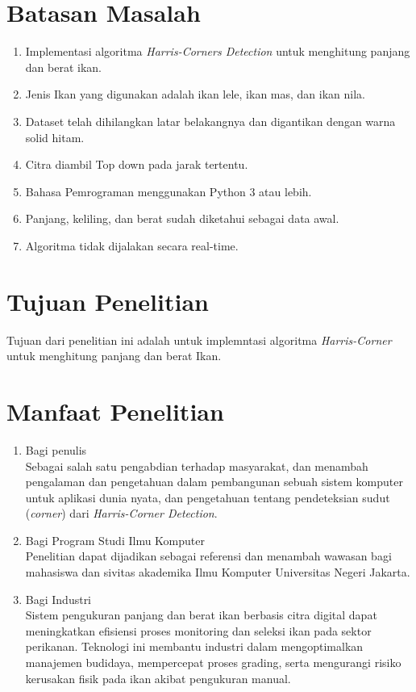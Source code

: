 \section{Batasan Masalah}
\begin{enumerate}
	\item Implementasi algoritma \emph{Harris-Corners Detection} untuk menghitung panjang dan berat ikan. 
	\item Jenis Ikan yang digunakan adalah ikan lele, ikan mas, dan ikan nila.
	\item Dataset telah dihilangkan latar belakangnya dan digantikan dengan warna solid hitam.
	\item Citra diambil Top down pada jarak tertentu. 
	\item Bahasa Pemrograman menggunakan Python 3 atau lebih. 
    \item Panjang, keliling, dan berat sudah diketahui sebagai data awal.
    \item Algoritma tidak dijalakan secara real-time.
\end{enumerate}
	
\section{Tujuan Penelitian}
Tujuan dari penelitian ini adalah untuk implemntasi algoritma \emph{Harris-Corner} untuk menghitung panjang dan berat Ikan.

\section{Manfaat Penelitian}
\begin{enumerate}
    \item Bagi penulis\\
    Sebagai salah satu pengabdian terhadap masyarakat, dan menambah pengalaman dan pengetahuan dalam pembangunan sebuah sistem komputer untuk aplikasi dunia nyata, dan pengetahuan tentang pendeteksian sudut (\emph{corner}) dari \emph{Harris-Corner Detection}.
    
    \item Bagi Program Studi Ilmu Komputer\\
    Penelitian dapat dijadikan sebagai referensi dan menambah wawasan bagi mahasiswa dan sivitas akademika Ilmu Komputer Universitas Negeri Jakarta.

    \item Bagi Industri\\
    Sistem pengukuran panjang dan berat ikan berbasis citra digital dapat meningkatkan efisiensi proses monitoring dan seleksi ikan pada sektor perikanan. Teknologi ini membantu industri dalam mengoptimalkan manajemen budidaya, mempercepat proses grading, serta mengurangi risiko kerusakan fisik pada ikan akibat pengukuran manual.
\end{enumerate}

\begin{comment}

\end{comment}
